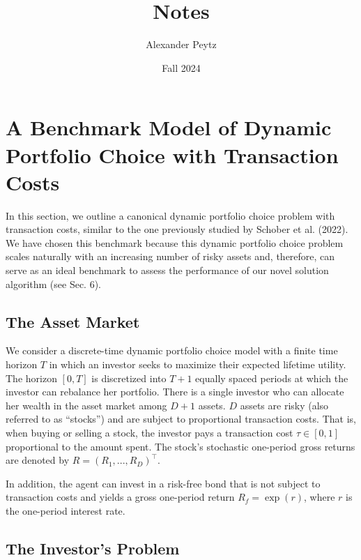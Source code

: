 \documentclass[10pt,a4paper]{article}
\title{Notes}
\author{Alexander Peytz}
\date{\vspace{-8ex}}
\date{Fall 2024}
\numberwithin{equation}{section} %
\begin{document}
\maketitle

\setcounter{secnumdepth}{0}


\section{A Benchmark Model of Dynamic Portfolio Choice with Transaction Costs}

In this section, we outline a canonical dynamic portfolio choice problem with transaction costs, similar to the one previously studied by Schober et al. (2022). We have chosen this benchmark because this dynamic portfolio choice problem scales naturally with an increasing number of risky assets and, therefore, can serve as an ideal benchmark to assess the performance of our novel solution algorithm (see Sec. 6).

\subsection{The Asset Market}

We consider a discrete-time dynamic portfolio choice model with a finite time horizon $T$ in which an investor seeks to maximize their expected lifetime utility. The horizon $[0, T]$ is discretized into $T+1$ equally spaced periods at which the investor can rebalance her portfolio. There is a single investor who can allocate her wealth in the asset market among $D+1$ assets. $D$ assets are risky (also referred to as “stocks”) and are subject to proportional transaction costs. That is, when buying or selling a stock, the investor pays a transaction cost $\tau \in [0, 1]$ proportional to the amount spent. The stock's stochastic one-period gross returns are denoted by $R = (R_1, ..., R_D)^\top$.

In addition, the agent can invest in a risk-free bond that is not subject to transaction costs and yields a gross one-period return $R_f = \exp(r)$, where $r$ is the one-period interest rate.

\subsection{The Investor’s Problem}
\end{document}
